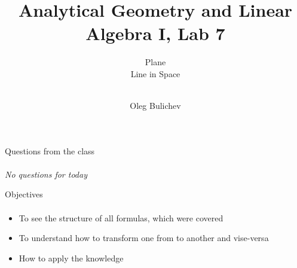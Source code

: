 \documentclass[aspectratio=169]{beamer}
\title[AGLA1]{Analytical Geometry and Linear Algebra I, Lab 7} %
\subtitle{Plane \\ Line in Space  \\ \    
         } %
\author{Oleg Bulichev}
\newcommand{\fbckg}[1]{\usebackgroundtemplate{\texttt{[image: \#1]}}}%
\begin{document}
\setlength{\abovedisplayskip}{0pt}
\setlength{\belowdisplayskip}{0pt}
\setlength{\abovedisplayshortskip}{0pt}
\setlength{\belowdisplayshortskip}{0pt}

\fbckg{fibeamer/figs/title_page.png}

\fbckg{fibeamer/figs/common.png}


\begin{frame}[c]{Questions from the class}
    \framesubtitle{}
    \centering
    \textit{ \Large No questions for today}
\end{frame}

\begin{frame}[t]{Objectives}
    \framesubtitle{}
    \begin{itemize}
        \item To see the structure of all formulas, which were covered
        \item To understand how to transform one from to another and vise-versa
        \item How to apply the knowledge
    \end{itemize}
\end{frame}
\end{document}
